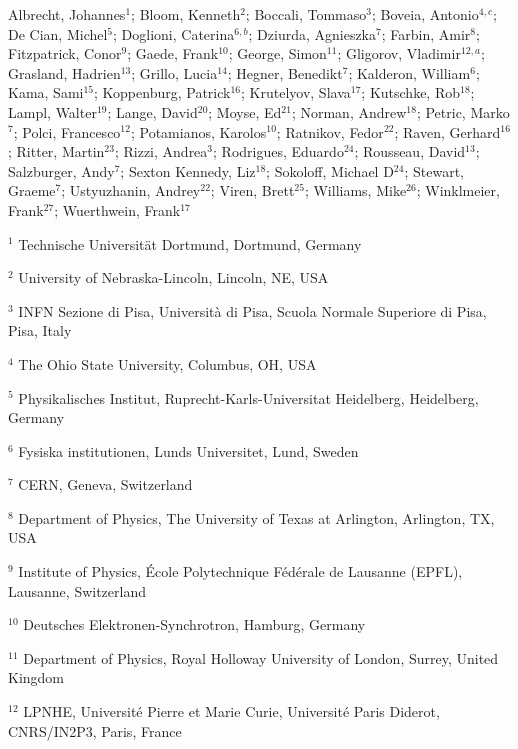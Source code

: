 Albrecht, Johannes$^{1}$;
Bloom, Kenneth$^{2}$;
Boccali, Tommaso$^{3}$;
Boveia, Antonio$^{4,c}$;
De Cian, Michel$^{5}$;
Doglioni, Caterina$^{6,b}$;
Dziurda, Agnieszka$^{7}$;
Farbin, Amir$^{8}$;
Fitzpatrick, Conor$^{9}$;
Gaede, Frank$^{10}$;
George, Simon$^{11}$;
Gligorov, Vladimir$^{12,a}$;
Grasland, Hadrien$^{13}$;
Grillo, Lucia$^{14}$;
Hegner, Benedikt$^{7}$;
Kalderon, William$^{6}$;
Kama, Sami$^{15}$;
Koppenburg, Patrick$^{16}$;
Krutelyov, Slava$^{17}$;
Kutschke, Rob$^{18}$;
Lampl, Walter$^{19}$;
Lange, David$^{20}$;
Moyse, Ed$^{21}$;
Norman, Andrew$^{18}$;
Petric, Marko$^{7}$;
Polci, Francesco$^{12}$;
Potamianos, Karolos$^{10}$;
Ratnikov, Fedor$^{22}$;
Raven, Gerhard$^{16}$;
Ritter, Martin$^{23}$;
Rizzi, Andrea$^{3}$;
Rodrigues, Eduardo$^{24}$;
Rousseau, David$^{13}$;
Salzburger, Andy$^{7}$;
Sexton Kennedy, Liz$^{18}$;
Sokoloff, Michael D$^{24}$;
Stewart, Graeme$^{7}$;
Ustyuzhanin, Andrey$^{22}$;
Viren, Brett$^{25}$;
Williams, Mike$^{26}$;
Winklmeier, Frank$^{27}$;
Wuerthwein, Frank$^{17}$
\bigskip 
\par {\footnotesize $^{1}$ Technische Universit\"at Dortmund, Dortmund, Germany}
\par {\footnotesize $^{2}$ University of Nebraska-Lincoln, Lincoln, NE, USA}
\par {\footnotesize $^{3}$ INFN Sezione di Pisa, Università di Pisa, Scuola Normale Superiore di Pisa, Pisa, Italy}
\par {\footnotesize $^{4}$ The Ohio State University, Columbus, OH, USA}
\par {\footnotesize $^{5}$ Physikalisches Institut, Ruprecht-Karls-Universitat Heidelberg, Heidelberg, Germany}
\par {\footnotesize $^{6}$ Fysiska institutionen, Lunds Universitet, Lund, Sweden}
\par {\footnotesize $^{7}$ CERN, Geneva, Switzerland}
\par {\footnotesize $^{8}$ Department of Physics, The University of Texas at Arlington, Arlington, TX, USA}
\par {\footnotesize $^{9}$ Institute of Physics, École Polytechnique F\'ed\'erale de Lausanne (EPFL), Lausanne, Switzerland}
\par {\footnotesize $^{10}$ Deutsches Elektronen-Synchrotron, Hamburg, Germany}
\par {\footnotesize $^{11}$ Department of Physics, Royal Holloway University of London, Surrey, United Kingdom}
\par {\footnotesize $^{12}$ LPNHE, Université Pierre et Marie Curie, Université Paris Diderot, CNRS/IN2P3, Paris, France}
